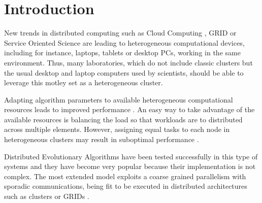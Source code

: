 \documentclass[final,1p,times]{elsarticle}
\begin{document}
\section{Introduction}
\label{sec:intro}




New trends in distributed computing such as Cloud Computing \cite{CLOUD}, GRID
\cite{OPENSCIENCEGRID} or Service Oriented Science \cite{GLOBUS} are
leading to heterogeneous computational devices, including for instance, laptops,
tablets or desktop PCs, working in the same
environment. Thus, many laboratories, which do not include classic
clusters but the usual desktop and laptop computers used by
scientists, should be able to leverage
this motley set as a heterogeneous cluster. 

Adapting algorithm parameters to available heterogeneous computational resources
leads to improved performance
\cite{AutomaticallyConfiguringStyles12}. An easy way to take advantage
of the available resources is  balancing the load
\cite{PARALLELIMPLEMENTATION} so that workloads are to distributed across multiple
elements. However, assigning equal tasks  to each node in
heterogeneous clusters may result in suboptimal performance
\cite{LoadBalancingBohn02}. 




Distributed Evolutionary
Algorithms \cite{MULTIKULTI,PARALLELGRIDHETEROGENEOUS} have been tested successfully in this
type of systems \cite{HETEROGENEOUSHARD} and they have become very popular because their implementation is
not complex.
The most extended model exploits a coarse grained parallelism with sporadic
 communications, being fit to be executed in distributed architectures
 such as clusters or GRIDs \cite{PLATO}.



\end{document}
